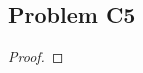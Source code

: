 \documentclass[../../../main.tex]{subfiles}
\begin{document}
\subsection{Problem C5}
\begin{wts}

\end{wts}
\begin{proof}

\end{proof}
\end{document}

